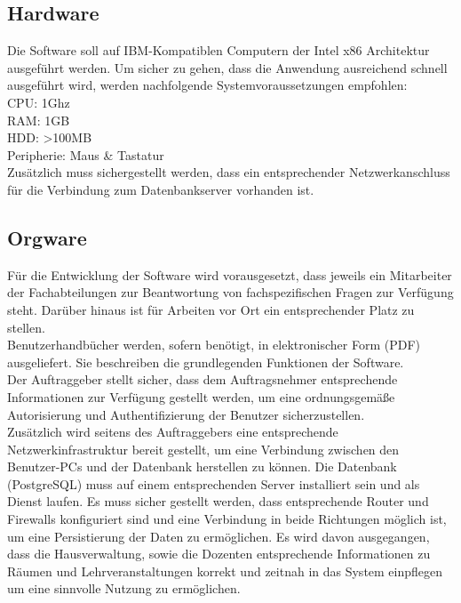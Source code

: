 \subsection{Hardware}
\label{subsec:hardware}

Die Software soll auf IBM-Kompatiblen Computern der Intel x86 Architektur ausgeführt werden.
Um sicher zu gehen, dass die Anwendung ausreichend schnell ausgeführt wird, werden nachfolgende Systemvoraussetzungen empfohlen:\\

CPU: 1Ghz\\
RAM: 1GB\\
HDD: >100MB\\
Peripherie: Maus \& Tastatur\\

Zusätzlich muss sichergestellt werden, dass ein entsprechender Netzwerkanschluss für die Verbindung zum Datenbankserver vorhanden ist.

\subsection{Orgware}

Für die Entwicklung der Software wird vorausgesetzt, dass jeweils ein Mitarbeiter der Fachabteilungen zur Beantwortung von fachspezifischen Fragen zur Verfügung steht. Darüber hinaus ist für Arbeiten vor Ort ein entsprechender Platz zu stellen.\\

Benutzerhandbücher werden, sofern benötigt, in elektronischer Form (PDF) ausgeliefert. Sie beschreiben die grundlegenden Funktionen der Software.\\

Der Auftraggeber stellt sicher, dass dem Auftragsnehmer entsprechende Informationen zur Verfügung gestellt werden, um eine ordnungsgemäße Autorisierung und Authentifizierung der Benutzer sicherzustellen.\\

Zusätzlich wird seitens des Auftraggebers eine entsprechende Netzwerkinfrastruktur bereit gestellt,  um eine Verbindung zwischen den Benutzer-PCs und der Datenbank herstellen zu können.
Die Datenbank (PostgreSQL) muss auf einem entsprechenden Server installiert sein und als Dienst laufen. Es muss sicher gestellt werden, dass entsprechende Router und Firewalls konfiguriert sind und eine Verbindung in beide Richtungen möglich ist, um eine Persistierung der Daten zu ermöglichen. 
Es wird davon ausgegangen, dass die Hausverwaltung, sowie die Dozenten entsprechende Informationen zu Räumen und Lehrveranstaltungen korrekt und zeitnah in das System einpflegen um eine sinnvolle Nutzung zu ermöglichen.

